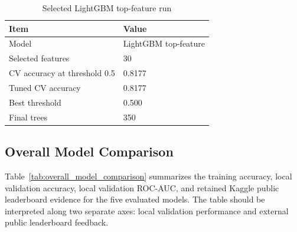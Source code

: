\documentclass[conference]{IEEEtran}
\begin{document}
\begin{table}[t]
\caption{Selected LightGBM top-feature run}
\label{tab:lightgbm_top_feature}
\centering
\footnotesize
\begingroup
\setlength{\tabcolsep}{4pt}
\renewcommand{\arraystretch}{1.16}
\begin{tabularx}{\linewidth}{l Y}
\toprule
Item & Value \\
\midrule
Model & LightGBM top-feature \\
Selected features & 30 \\
CV accuracy at threshold 0.5 & 0.8177 \\
Tuned CV accuracy & 0.8177 \\
Best threshold & 0.500 \\
Final trees & 350 \\
\bottomrule
\end{tabularx}
\endgroup
\end{table}

\subsection{Overall Model Comparison}

Table~\ref{tab:overall_model_comparison} summarizes the training accuracy, local validation accuracy,
local validation ROC-AUC, and retained Kaggle public leaderboard evidence for the five evaluated models.
The table should be interpreted along two separate axes: local validation performance and external public
leaderboard feedback.

\begin{table}[t]
\caption{Overall comparison of local validation performance and retained Kaggle public leaderboard evidence}
\label{tab:overall_model_comparison}
\centering
\footnotesize
{}
\end{table}
\end{document}
